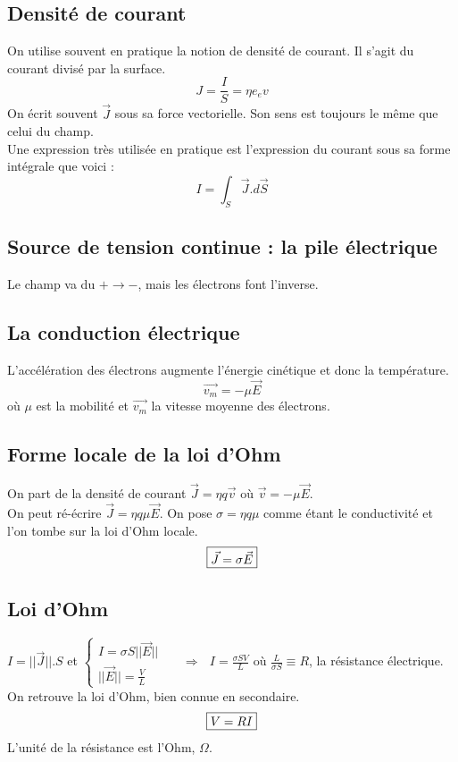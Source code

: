 \documentclass	[11pt, a4paper, openany]{book}
\begin{document}
\subsection{Densité de courant}
On utilise souvent en pratique la notion de densité de courant. Il s'agit du courant divisé par la surface.
\begin{equation}
J = \frac{I}{S}= \eta e_e v
\end{equation}
On écrit souvent $\vec{J}$ sous sa force vectorielle. Son sens est toujours le même que celui du champ. \\
Une expression très utilisée en pratique est l'expression du courant sous sa forme intégrale que voici :
\begin{equation}
I = \int_S \vec{J}.d\vec{S}
\end{equation}

\subsection{Source de tension continue : la pile électrique}
Le champ va du $+ \rightarrow -$, mais les électrons font l'inverse.

\subsection{La conduction électrique}
L'accélération des électrons augmente l'énergie cinétique et donc la température. 
\begin{equation}
\vec{v_m} = -\mu \vec{E}
\end{equation}
où $\mu$ est la mobilité et $\vec{v_m}$ la vitesse moyenne des électrons.

\subsection{Forme locale de la loi d'Ohm}
On part de la densité de courant $\vec{J} = \eta q \vec{v}$ où $\vec{v} = -\mu \vec{E}$.\\
On peut ré-écrire $\vec{J} = \eta q \mu \vec{E}$. On pose $\sigma = \eta q \mu$ comme étant le conductivité et l'on tombe sur la loi d'Ohm locale.
\begin{equation}
\fbox{$\vec{J} = \sigma\vec{E}$}
\end{equation}

\subsection{Loi d'Ohm}
$I = ||\vec{J}||.S$ et $\left\{\begin{array}{l}
I = \sigma S ||\vec{E}||\\
||\vec{E}|| = \frac{V}{L}
\end{array}\right.$\ \ \ $\Rightarrow\ \ \ I = \frac{\sigma S V}{L}$ où $\frac{L}{\sigma S} \equiv R$, la résistance électrique.\\
On retrouve la loi d'Ohm, bien connue en secondaire.
\begin{equation}
\fbox{$V = RI$}
\end{equation}
L'unité de la résistance est l'Ohm, $\Omega$.
\end{document}
